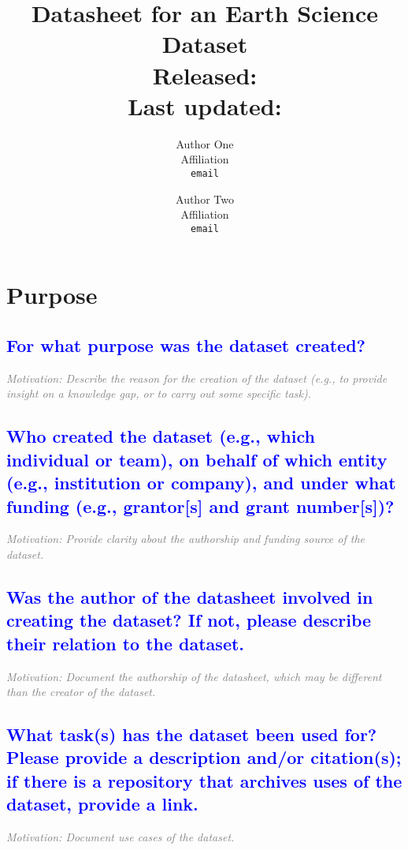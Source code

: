 \documentclass[letterpaper, 10 pt, transmag]{IEEEtran}
\title{
\LARGE \textbf{Datasheet for an Earth Science Dataset}
\\ \normalsize Released: %
\\ \footnotesize Last updated: %
}
\author{ Author One \\
	Affiliation \\
	\texttt{email} \\
	\and
	Author Two \\
	Affiliation \\
	\texttt{email} \\
}
\begin{document}
\maketitle
\thispagestyle{fancy}
\pagestyle{fancy}
\section{Purpose}

\textcolor{blue}{\subsection{For what purpose was the dataset created?}}
\textcolor{gray}{\textit{Motivation: Describe the reason for the creation of the dataset (e.g., to provide insight on a knowledge gap, or to carry out some specific task).}}

\textcolor{blue}{\subsection{Who created the dataset (e.g., which individual or team), on behalf of which entity (e.g., institution or company), and under what funding (e.g., grantor[s] and grant number[s])?}}
\textcolor{gray}{\textit{Motivation: Provide clarity about the authorship and funding source of the dataset.}}

\textcolor{blue}{\subsection{Was the author of the datasheet involved in creating the dataset? If not, please describe their relation to the dataset.}}
\textcolor{gray}{\textit{Motivation: Document the authorship of the datasheet, which may be different than the creator of the dataset.}}

\textcolor{blue}{\subsection{What task(s) has the dataset been used for? Please provide a description and/or citation(s); if there is a repository that archives uses of the dataset, provide a link.}}
\textcolor{gray}{\textit{Motivation: Document use cases of the dataset.}}
\end{document}
